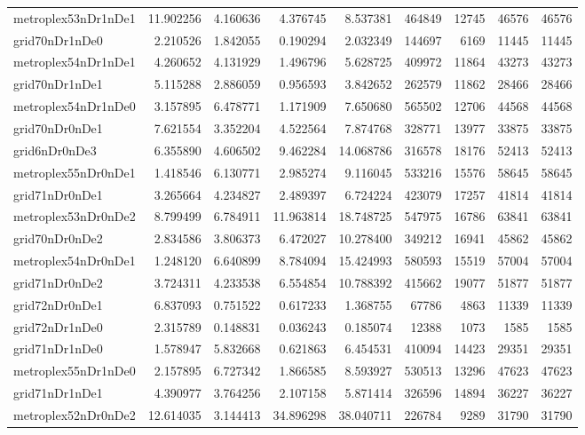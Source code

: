 \begin{longtable}{|l|r|r|r|r|r|r|r|r|}
metroplex53nDr1nDe1 & 11.902256 & 4.160636 & 4.376745 & 8.537381 & 464849 & 12745 & 46576 & 46576 \\
grid70nDr1nDe0 & 2.210526 & 1.842055 & 0.190294 & 2.032349 & 144697 & 6169 & 11445 & 11445 \\
metroplex54nDr1nDe1 & 4.260652 & 4.131929 & 1.496796 & 5.628725 & 409972 & 11864 & 43273 & 43273 \\
grid70nDr1nDe1 & 5.115288 & 2.886059 & 0.956593 & 3.842652 & 262579 & 11862 & 28466 & 28466 \\
metroplex54nDr1nDe0 & 3.157895 & 6.478771 & 1.171909 & 7.650680 & 565502 & 12706 & 44568 & 44568 \\
grid70nDr0nDe1 & 7.621554 & 3.352204 & 4.522564 & 7.874768 & 328771 & 13977 & 33875 & 33875 \\
grid6nDr0nDe3 & 6.355890 & 4.606502 & 9.462284 & 14.068786 & 316578 & 18176 & 52413 & 52413 \\
metroplex55nDr0nDe1 & 1.418546 & 6.130771 & 2.985274 & 9.116045 & 533216 & 15576 & 58645 & 58645 \\
grid71nDr0nDe1 & 3.265664 & 4.234827 & 2.489397 & 6.724224 & 423079 & 17257 & 41814 & 41814 \\
metroplex53nDr0nDe2 & 8.799499 & 6.784911 & 11.963814 & 18.748725 & 547975 & 16786 & 63841 & 63841 \\
grid70nDr0nDe2 & 2.834586 & 3.806373 & 6.472027 & 10.278400 & 349212 & 16941 & 45862 & 45862 \\
metroplex54nDr0nDe1 & 1.248120 & 6.640899 & 8.784094 & 15.424993 & 580593 & 15519 & 57004 & 57004 \\
grid71nDr0nDe2 & 3.724311 & 4.233538 & 6.554854 & 10.788392 & 415662 & 19077 & 51877 & 51877 \\
grid72nDr0nDe1 & 6.837093 & 0.751522 & 0.617233 & 1.368755 & 67786 & 4863 & 11339 & 11339 \\
grid72nDr1nDe0 & 2.315789 & 0.148831 & 0.036243 & 0.185074 & 12388 & 1073 & 1585 & 1585 \\
grid71nDr1nDe0 & 1.578947 & 5.832668 & 0.621863 & 6.454531 & 410094 & 14423 & 29351 & 29351 \\
metroplex55nDr1nDe0 & 2.157895 & 6.727342 & 1.866585 & 8.593927 & 530513 & 13296 & 47623 & 47623 \\
grid71nDr1nDe1 & 4.390977 & 3.764256 & 2.107158 & 5.871414 & 326596 & 14894 & 36227 & 36227 \\
metroplex52nDr0nDe2 & 12.614035 & 3.144413 & 34.896298 & 38.040711 & 226784 & 9289 & 31790 & 31790 \\

\end{longtable}
